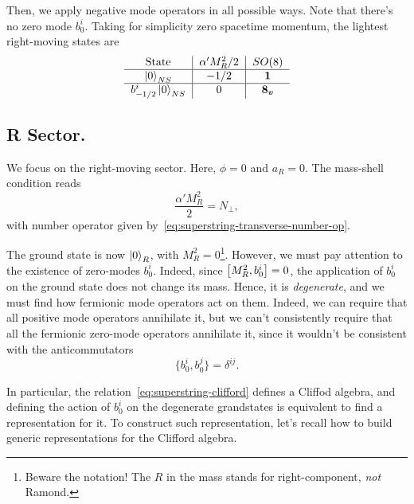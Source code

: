 Then, we apply negative mode operators in all possible ways. Note that there's no zero mode $b^i_0$. Taking for simplicity zero spacetime momentum, the lightest right-moving states are
\begin{equation}\label{eq:table-NS}
\begin{tabular}{c|c|c} %
    State & $\alpha' M^2_R / 2$ & $SO(8)$ \\ \hline
    $\ket{0}_{NS}$   & $-1/2$   & $\i$   \\ \hline
    $b^i_{-1/2} \ket{0}_{NS}$   & $0$   & $\v$  %
\end{tabular}
\end{equation}

\subsection{R Sector.}
We focus on the right-moving sector. Here, $\phi = 0$ and $a_R = 0$. The mass-shell condition reads
\begin{equation}\label{eq:R-mass-shell}
    \frac{\alpha' M^2_R}{2} = N_\perp,
\end{equation}
with number operator given by~\eqref{eq:superstring-transverse-number-op}.

The ground state is now $\ket{0}_R$, with $M_R^2 = 0$\footnote{Beware the notation! The $R$ in the mass stands for right-component, \emph{not} Ramond.}. However, we must pay attention to the existence of zero-modes $b^i_0$. Indeed, since $\comm{M^2_R}{b^i_0} = 0$, the application of $b^i_0$ on the ground state does not change its mass. Hence, it is \emph{degenerate}, and we must find how fermionic mode operators act on them. Indeed, we can require that all positive mode operators annihilate it, but we can't consistently require that all the fermionic zero-mode operators annihilate it, since it wouldn't be consistent with the anticommutators
\begin{equation}\label{eq:superstring-clifford}
    \{ b^i_0, b^j_0 \} = \delta^{ij}.
\end{equation}

In particular, the relation~\eqref{eq:superstring-clifford} defines a Cliffod algebra, and defining the action of $b^i_0$ on the degenerate grandstates is equivalent to find a representation for it. To construct such representation, let's recall how to build generic representations for the Clifford algebra.

